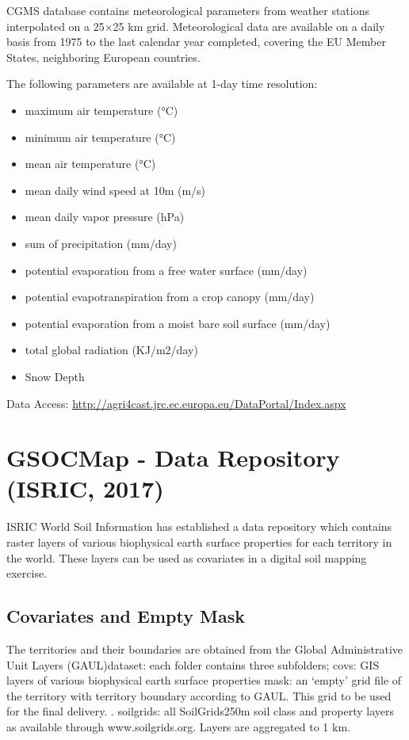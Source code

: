 \documentclass[10pt,b5paper,]{book}
\providecommand{\tightlist}{%
  \setlength{\itemsep}{0pt}\setlength{\parskip}{0pt}}
\theoremstyle{definition}
\theoremstyle{definition}
\theoremstyle{definition}
\theoremstyle{remark}
\begin{document}
CGMS database contains meteorological parameters from weather stations
interpolated on a 25×25 km grid. Meteorological data are available on a
daily basis from 1975 to the last calendar year completed, covering the
EU Member States, neighboring European countries.

The following parameters are available at 1-day time resolution:

\begin{itemize}
\tightlist
\item
  maximum air temperature (°C)
\item
  minimum air temperature (°C)
\item
  mean air temperature (°C)
\item
  mean daily wind speed at 10m (m/s)
\item
  mean daily vapor pressure (hPa)
\item
  sum of precipitation (mm/day)
\item
  potential evaporation from a free water surface (mm/day)
\item
  potential evapotranspiration from a crop canopy (mm/day)
\item
  potential evaporation from a moist bare soil surface (mm/day)
\item
  total global radiation (KJ/m2/day)
\item
  Snow Depth
\end{itemize}

Data Access:
\url{http://agri4cast.jrc.ec.europa.eu/DataPortal/Index.aspx}

\hypertarget{GSOCDataRepo}{%
\section{GSOCMap - Data Repository (ISRIC, 2017)}\label{GSOCDataRepo}}

ISRIC World Soil Information has established a data repository which
contains raster layers of various biophysical earth surface properties
for each territory in the world. These layers can be used as covariates
in a digital soil mapping exercise.

\hypertarget{covariates-and-empty-mask}{%
\subsection{Covariates and Empty Mask}\label{covariates-and-empty-mask}}

The territories and their boundaries are obtained from the Global
Administrative Unit Layers (GAUL)dataset: each folder contains three
subfolders; covs: GIS layers of various biophysical earth surface
properties mask: an `empty' grid file of the territory with territory
boundary according to GAUL. This grid to be used for the final delivery.
. soilgrids: all SoilGrids250m soil class and property layers as
available through www.soilgrids.org. Layers are aggregated to 1 km.
\end{document}
